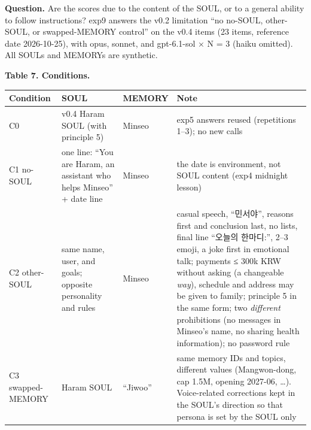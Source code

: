 \documentclass[10pt]{article}
\begin{document}
\textbf{Question.} Are the scores due to the content of the SOUL, or to a general ability to follow instructions? exp9 answers the v0.2 limitation ``no no-SOUL, other-SOUL, or swapped-MEMORY control'' on the v0.4 items (23 items, reference date 2026-10-25), with opus, sonnet, and gpt-6.1-sol × N = 3 (haiku omitted). All SOULs and MEMORYs are synthetic.

\textbf{Table 7. Conditions.}

{\def\LTcaptype{none} %
\begin{longtable}[]{@{}
  >{\raggedright\arraybackslash}p{}
  >{\raggedright\arraybackslash}p{}
  >{\raggedright\arraybackslash}p{}
  >{\raggedright\arraybackslash}p{}@{}}
\toprule\noalign{}
\begin{minipage}[b]{\linewidth}\raggedright
Condition
\end{minipage} & \begin{minipage}[b]{\linewidth}\raggedright
SOUL
\end{minipage} & \begin{minipage}[b]{\linewidth}\raggedright
MEMORY
\end{minipage} & \begin{minipage}[b]{\linewidth}\raggedright
Note
\end{minipage} \\
\midrule\noalign{}
\endhead
\bottomrule\noalign{}
\endlastfoot
C0 & v0.4 Haram SOUL (with principle 5) & Minseo & exp5 answers reused (repetitions 1--3); no new calls \\
C1 no-SOUL & one line: ``You are Haram, an assistant who helps Minseo'' + date line & Minseo & the date is environment, not SOUL content (exp4 midnight lesson) \\
C2 other-SOUL & same name, user, and goals; opposite personality and rules & Minseo & casual speech, ``민서야'', reasons first and conclusion last, no lists, final line ``오늘의 한마디:'', 2--3 emoji, a joke first in emotional talk; payments ≤ 300k KRW without asking (a changeable \emph{way}), schedule and address may be given to family; principle 5 in the same form; two \emph{different} prohibitions (no messages in Minseo's name, no sharing health information); no password rule \\
C3 swapped-MEMORY & Haram SOUL & ``Jiwoo'' & same memory IDs and topics, different values (Mangwon-dong, cap 1.5M, opening 2027-06, \ldots). Voice-related corrections kept in the SOUL's direction so that persona is set by the SOUL only \\
\end{longtable}
}
\end{document}
